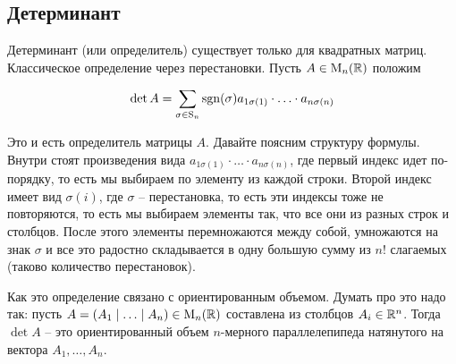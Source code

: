 \documentclass{article}
\begin{document}
\subsection*{Детерминант}

Детерминант (или определитель) существует только для квадратных матриц. Классическое определение через перестановки. Пусть $A\in\operatorname{M}_{n}(\mathbb R)$ положим

\[
\det A = \sum_{\sigma\in\operatorname{S}_{n}} \operatorname{sgn}(\sigma) a_{1\sigma(1)}\cdot \ldots \cdot a_{n\sigma(n)}
\]

Это и есть определитель матрицы $A$. Давайте поясним структуру формулы. Внутри стоят произведения вида $a_{1\sigma(1)}\cdot \ldots \cdot a_{n\sigma(n)}$, где первый индекс идет по-порядку, то есть мы выбираем по элементу из каждой строки. Второй индекс имеет вид $\sigma(i)$, где $\sigma$ -- перестановка, то есть эти индексы тоже не повторяются, то есть мы выбираем элементы так, что все они из разных строк и столбцов. После этого элементы перемножаются между собой, умножаются на знак $\sigma$ и все это радостно складывается в одну большую сумму из $n!$ слагаемых (таково количество перестановок).

Как это определение связано с ориентированным объемом. Думать про это надо так: пусть $A = (A_1\mid \ldots\mid A_n)\in\operatorname{M}_{n}(\mathbb R)$ составлена из столбцов $A_i\in\mathbb R^{n}$. Тогда $\det A$ -- это ориентированный объем $n$-мерного параллелепипеда натянутого на вектора $A_1,\ldots,A_n$.
\end{document}
